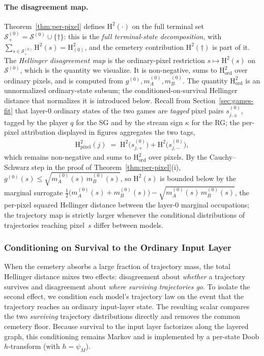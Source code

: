 \documentclass[twoside]{article}
\newcommand{\1}{\mathbf{1}}
\begin{document}
\paragraph{The disagreement map.}
Theorem~\ref{thm:per-pixel} defines $\mathrm{H}^2(\cdot)$ on the full terminal set
$\mathcal{S}^{(0)}_+ = \mathcal{S}^{(0)} \cup \{\dagger\}$: this is the \emph{full terminal-state
decomposition}, with $\sum_{s \in \mathcal{S}^{(0)}_+} \mathrm{H}^2(s) = \mathrm{H}^2_{(0)}$, and
the cemetery contribution $\mathrm{H}^2(\dagger)$ is part of it. The \emph{Hellinger disagreement
map} is the ordinary-pixel restriction $s \mapsto \mathrm{H}^2(s)$ on $\mathcal{S}^{(0)}$, which is
the quantity we visualize. It is non-negative, sums to $\mathrm{H}^2_{\mathrm{ord}}$ over ordinary
pixels, and is computed from $g^{(0)}, m_A^{(0)}, m_B^{(0)}$.  The quantity
$\mathrm{H}^2_{\mathrm{ord}}$ is an unnormalized ordinary-state subsum; the conditioned-on-survival
Hellinger distance that normalizes it is introduced below. Recall from Section~\ref{sec:games-fit}
that layer-$0$ ordinary states of the two games are \emph{tagged} pixel pairs $s^{(0)}_{j,\pm}$,
tagged by the player $q$ for the \ac{SG} and by the stream sign $\kappa$ for the \ac{RG}; the
per-pixel attribution displayed in figures aggregates the two tags,
\begin{align}
    \mathrm{H}^2_{\mathrm{pixel}}(j) \;=\; \mathrm{H}^2\bigl(s^{(0)}_{j,+}\bigr) +
    \mathrm{H}^2\bigl(s^{(0)}_{j,-}\bigr),
\end{align}
which remains non-negative and sums to $\mathrm{H}^2_{\mathrm{ord}}$ over pixels.  By the
Cauchy--Schwarz step in the proof of Theorem~\ref{thm:per-pixel}(i), $g^{(0)}(s) \leq
    \sqrt{m^{(0)}_A(s)\,m^{(0)}_B(s)}$, so $\mathrm{H}^2(s)$ is bounded below by the marginal surrogate
$\tfrac{1}{2}\bigl(m^{(0)}_A(s) + m^{(0)}_B(s)\bigr) - \sqrt{m^{(0)}_A(s)\,m^{(0)}_B(s)}$, the
per-pixel squared Hellinger distance between the layer-0 marginal occupations; the trajectory map
is strictly larger whenever the conditional distributions of trajectories reaching pixel~$s$ differ
between models.

\subsubsection{Conditioning on Survival to the Ordinary Input
Layer}\label{sec:lmp-conditioned-survival}

When the cemetery absorbs a large fraction of trajectory mass, the total Hellinger distance mixes
two effects: disagreement about \emph{whether} a trajectory survives and disagreement about
\emph{where surviving trajectories go}.  To isolate the second effect, we condition each model's
trajectory law on the event that the trajectory reaches an ordinary input-layer state.  The
resulting scalar compares the two \emph{surviving} trajectory distributions directly and removes
the common cemetery floor.  Because survival to the input layer factorizes along the layered graph,
this conditioning remains Markov and is implemented by a per-state Doob $h$-transform (with $h =
    \psi_M$).
\end{document}
